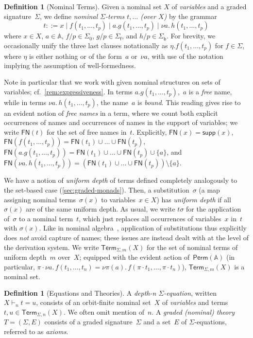 \documentclass[a4paper,UKenglish,cleveref,thm-restate,numberwithinsect,final]{lipics-v2021}
\newcommand{\Perm}{\mathsf{Perm}(\Names)}
\newcommand{\Term}{\mathsf{Term}}
\newcommand{\sigp}{\Sigma_0}
\newcommand{\sigf}{\Sigma_{\mathsf f}}
\newcommand{\sigb}{\Sigma_{\mathsf b}}
\newcommand{\FN}{\mathsf{FN}}
\newcommand{\Names}{\mathbb{A}}
\newcommand{\supp}{\mathsf{supp}}
\theoremstyle{plain}
\numberwithin{equation}{section}
\newcommand{\+}[1]{\mathcal{#1}\xspace}
\theoremstyle{definition}
\newtheorem{defn}[theorem]{Definition}
\begin{document}
\begin{defn}[Nominal Terms]
  Given a nominal set \(X\) of \emph{variables} and a graded
  signature~$\Sigma$, we define \emph{nominal $\Sigma$-terms $t,\dots$
    (over \(X\))} by the grammar
    \[
      t ::= x \mid f(t_1, \ldots, t_p) \mid a.g(t_1, \ldots, t_p) \mid
      \nu a.\,h(t_1, \ldots, t_p)
    \]
    where \(x \in X\), \(a \in \Names\), \(f/p \in \sigp\),
    \(g/p \in \sigf\), and \(h/p \in \sigb\). For brevity, we
    occasionally unify the three last clauses notationally as
    $\eta.f(t_1,\dots,t_p)$ for $f\in\Sigma$, where $\eta$ is either
    nothing or of the form~$a$ or~$\nu a$, with use of the notation
    implying the assumption of well-formedness.
\end{defn}
\noindent Note in particular that we work with given nominal structures
on sets of variables; cf.~\cref{rem:expressiveness}. In terms
$a.g(t_1,\dots,t_p)$,~$a$ is a \emph{free} name, while in terms
$\nu a.\,h(t_1, \ldots, t_p)$, the name~$a$ is \emph{bound}. This
reading gives rise to an evident notion of \emph{free names} in a
term, where we count both explicit occurrences of names and
occurrences of names in the support of variables; we write $\FN(t)$
for the set of free names in~$t$. Explicitly, $\FN(x)=\supp(x)$,
$\FN(f(t_1,\dots,t_p))=\FN(t_1)\cup\dots\cup\FN(t_p)$,
$\FN(a.g(t_1,\dots,t_p))=\FN(t_1)\cup\dots\cup\FN(t_p)\cup\{a\}$, and
$\FN(\nu
a.\,h(t_1,\dots,t_p))=(\FN(t_1)\cup\dots\cup\FN(t_p))\setminus
\{a\}$.

We have a notion of \emph{uniform depth} of terms defined completely
analogously to the set-based case (\cref{sec:graded-monads}). Then,
a substitution~$\sigma$ (a map assigning nominal terms~$\sigma(x)$ to
variables~$x\in X$) has \emph{uniform depth} if all $\sigma(x)$ are of
the same uniform depth. As usual, we write $t\sigma$ for the
application of~$\sigma$ to a nominal term~$t$, which just replaces all
occurrences of variables~$x$ in~$t$ with $\sigma(x)$. Like in nominal
algebra~\cite{GabbayMathijssen07,Gabbay09,GabbayMathijssen09},
application of substitutions thus explicitly does \emph{not} avoid
capture of names; these issues are instead dealt with at the level of
the derivation system. We write $\Term_{\Sigma,m}(X)$ for the set of
nominal terms of uniform depth~$m$ over~$X$; equipped with the evident
action of~$\Perm$ (in particular,
$\pi\cdot\nu a.\,f(t_1,\dots,t_n)=\nu\pi(a).\,f(\pi\cdot
t_1,\dots,\pi\cdot t_n)$), $\Term_{\Sigma,m}(X)$ is a nominal set.

\begin{defn}[Equations and Theories]
  A \emph{depth-n $\Sigma$-equation}, written \(X \vdash_n t = u\),
  consists of an orbit-finite nominal set~\(X\) of \emph{variables}
  and terms \(t, u \in \Term_{\Sigma, n}(X)\).  We often omit mention
  of~$n$.  A \emph{graded (nominal) theory} \(T = (\Sigma, E)\)
  consists of a graded signature~\(\Sigma\) and a set~\(E\) of
  \(\Sigma\)-equations, referred to as \emph{axioms}.
\end{defn}
\end{document}
